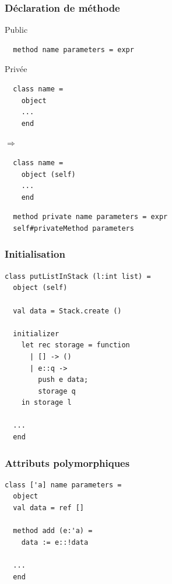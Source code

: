 \begin{frame}[fragile]
	\frametitle{Déclaration de méthode}
	\begin{block}{Public}
		\begin{lstlisting}
  method name parameters = expr
		\end{lstlisting}
	\end{block}
	\begin{block}{Privée}
		\begin{minipage}{0.4\textwidth}
  			\begin{lstlisting}
  class name =
    object
    ...
    end
			\end{lstlisting}
		\end{minipage}$\Rightarrow$
		\begin{minipage}{0.4\textwidth}
			\begin{lstlisting}
  class name =
    object (self)
    ...
    end
			\end{lstlisting}
		\end{minipage}
	\end{block}
	\begin{lstlisting}
  method private name parameters = expr
  self#privateMethod parameters
	\end{lstlisting}
\end{frame}

\begin{frame}[fragile]
	\frametitle{Initialisation}
	\begin{lstlisting}
class putListInStack (l:int list) =
  object (self)
    
  val data = Stack.create ()

  initializer
    let rec storage = function
      | [] -> ()
      | e::q -> 
        push e data;
        storage q
    in storage l

  ...
  end
	\end{lstlisting}
\end{frame}

\begin{frame}[fragile]
	\frametitle{Attributs polymorphiques}
	\begin{lstlisting}
class ['a] name parameters =
  object 
  val data = ref []

  method add (e:'a) =
    data := e::!data
  
  ...
  end
	\end{lstlisting}
\end{frame}

